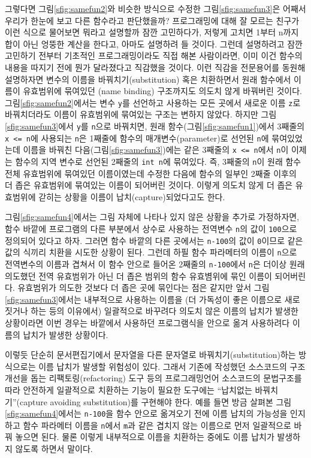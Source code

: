 그렇다면 그림\;\ref{sfig:samefun2}와 비슷한 방식으로 수정한 
그림\;\ref{sfig:samefun3}은 어째서 우리가 한눈에 보고 다른 함수라고 판단했을까?
프로그래밍에 대해 잘 모르는 친구가 이런 식으로 물어보면 뭐라고 설명할까
잠깐 고민하다가, 저렇게 고치면 1부터 n까지 합이 아닌 엉뚱한 계산을 한다고,
아마도 설명하려 들 것이다. 그런데 설명하려고 잠깐 고민하기 전부터
기초적인 프로그래밍이라도 직접 해본 사람이라면, 이미 이건 함수의 내용을
따지기 전에 뭔가 달라졌다고 직감했을 것이다. 이런 직감을 전문용어를
동원해 설명하자면 변수의 이름을 바꿔치기(substitution) 혹은 치환하면서
원래 함수에서 이름이 유효범위에 묶여있던 (name binding) 구조까지도 의도치
않게 바꿔버린 것이다. 그림\;\ref{sfig:samefun2}에서는 변수 \texttt{y}를 선언하고
사용하는 모든 곳에서 새로운 이름 \texttt{z}로 바꿔치더라도 이름이 유효범위에
묶여있는 구조는 변하지 않았다. 하지만 그림\;\ref{sfig:samefun3}에서 \texttt{y}를
\texttt{n}으로 바꿔치면, 원래 함수(그림\;\ref{sfig:samefun1})에서 3째줄의
\texttt{x\,<=\,n}에 사용되는 \texttt{n}은 1째줄에 함수의 매개변수(parameter)로
선언된 \texttt{n}에 묶여있었는데 이름을 바꿔친 다음(그림\;\ref{sfig:samefun3})에는
같은 3째줄의 \texttt{x\,<=\,n}에서 \texttt{n}이 이제는 함수의 지역 변수로 선언된
2째줄의 \texttt{int n}에 묶여있다. 즉, 3째줄의 \texttt{n}이 원래 함수 전체
유효범위에 묶여있던 이름이였는데 수정한 다음에 함수의 일부인 2째줄 이후의
더 좁은 유효범위에 묶여있는 이름이 되어버린 것이다. 이렇게 의도치 않게
더 좁은 유효범위에 갇히는 상황을 이름이 납치(capture)되었다고도 한다.

그림\;\ref{sfig:samefun4}에서는 그림 자체에 나타나 있지 않은 상황을 추가로
가정하자면, 함수 바깥에 프로그램의 다른 부분에서 상수로 사용하는 전역변수
\texttt{n}의 값이 \texttt{100}으로 정의되어 있다고 하자. 그러면 함수 바깥의
다른 곳에서는 \texttt{n-100}의 값이 \texttt{0}이므로 같은 값의 식끼리 치환을
시도한 상황이 된다. 그런데 하필 함수 파라메터의 이름이 \texttt{n}으로 전역변수의
이름과 겹쳐서 이 함수 안으로 들어온 2째줄의 \texttt{n-100}에서 \texttt{n}은
더이상 원래 의도했던 전역 유효범위가 아닌 더 좁은 범위의 함수 유효볌위에 묶인
이름이 되어버린다. 유효범위가 의도한 것보다 더 좁은 곳에 묶인다는 점은 같지만
앞서 그림\;\ref{sfig:samefun3}에서는 내부적으로 사용하는 이름을 (더 가독성이
좋은 이름으로 새로 짓거나 하는 등의 이유에서) 일괄적으로 바꾸려다 의도치 않은
이름의 납치가 발생한 상황이라면 이번 경우는 바깥에서 사용하던 프로그램식을
안으로 옮겨 사용하려다 이름의 납치가 발생한 상황이다.

이렇듯 단순히 문서편집기에서 문자열을 다른 문자열로 바꿔치기(substitution)하는
방식으로는 이름 납치가 발생할 위험성이 있다. 그래서 기존에 작성했던 소스코드의
구조개선을 돕는 리팩토링(refactoring) 도구 등의 프로그래밍언어 소스코드의
문법구조를 따라 안전하게 일괄적으로 치환하는 기능이 필요한 도구에는
``납치없는 바꿔치기''(capture avoiding substitution)를 구현해야
한다. 예를 들면 방금 살펴본 그림\;\ref{sfig:samefun4}에서는 \texttt{n-100}을
함수 안으로 옮겨오기 전에 이름 납치의 가능성을 인지하고 함수 파라메터 이름을
\texttt{n}에서 \texttt{m}과 같은 겹치지 않는 이름으로 먼저 일괄적으로 바꿔
놓으면 된다. 물론 이렇게 내부적으로 이름을 치환하는 중에도 이름 납치가 발생하지
않도록 하면서 말이다.

